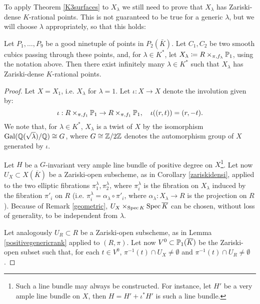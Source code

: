 \documentclass[a4paper,12pt]{article}
\begin{document}
To apply Theorem \ref{K3surfaces} to $X_{\lambda}$ we still need to prove that $X_{\lambda}$ has Zariski-dense $K$-rational points. This is not guaranteed to be true for a generic $\lambda$, but we will choose $\lambda$ appropriately, so that this holds:

\begin{proposition}\label{nontrivialfamily}
	Let $P_1, \dots, P_9$ be a good ninetuple of points in $P_2(\bar{K})$. Let $C_1,C_2$ be two smooth cubics passing through these points, and, for $\lambda \in K^*$, let $X_{\lambda}\defeq R \times_{\pi,f_{\lambda}} \P_1$, using the notation above. Then there exist infinitely many $\lambda \in K^*$ such that $X_{\lambda}$ has Zariski-dense $K$-rational points.
\end{proposition}
\begin{proof}
	Let $X=X_1$, i.e. $X_{\lambda}$ for $\lambda = 1$. Let $\iota:X \rightarrow X$ denote the involution given by:
	\begin{equation}
		\iota:R \times_{\pi,f_1} \P_1 \rightarrow R \times_{\pi,f_1} \P_1, \quad
		\iota((r,t))=(r,-t).
	\end{equation}
	We note that, for $\lambda \in K^*$, $X_{\lambda}$ is a twist of $X$ by the isomorphism $\Gal (\Q(\sqrt{\lambda})/\Q) \cong G$, where $G\cong \Z/2\Z$ denotes the automorphism group of $X$ generated by $\iota$. 
	
	Let $H$ be a $G$-invariant very ample line bundle of positive degree on $X$\footnote{Such a line bundle may always be constructed. For instance, let $H'$ be a very ample line bundle on $X$, then $H=H' + \iota^* H'$ is such a line bundle.}. Let now $U_X \subset X(\overline{K})$ be a Zariski-open subscheme, as in Corollary \ref{zariskidensi}, applied to the two elliptic fibrations $\pi_1^{\lambda}, \pi_2^{\lambda}$, where $\pi_i^{\lambda}$ is the fibration on $X_{\lambda}$ induced by the fibration $\pi'_i$ on $R$ (i.e. $\pi_i^{\lambda}=\alpha_{\lambda}\circ \pi'_i$, where $\alpha_{\lambda}:X_{\lambda}\rightarrow R$ is the projection on $R$). Because of Remark \ref{geometric}, $U_X\times_{\Spec K} \Spec \overline{K}$ can be chosen, without loss of generality, to be independent from $\lambda$.
	
	Let analogously $U_R \subset R$ be a Zariski-open subscheme, as in Lemma \ref{positivegenericrank} applied to $(R,\pi)$. Let now $V^0 \subset \P_1(\overline{K})$ be the Zariski-open subset such that, for each $t \in V^0$, $\pi^{-1}(t)\cap U_X \neq \emptyset$ and $\pi^{-1}(t)\cap U_R\neq \emptyset$.
	

\end{proof}
\end{document}
